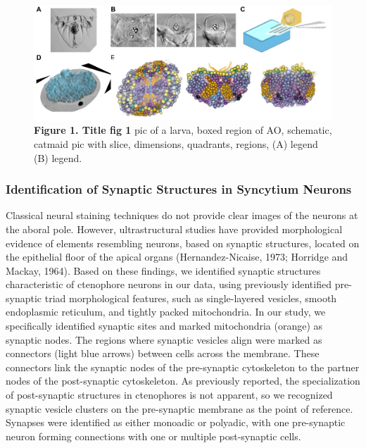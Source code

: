 \documentclass[
  11pt,
]{article}
\begin{document}
\begin{figure}[H]

{\centering \includegraphics[width=1\textwidth,height=\textheight]{figures/Figure1.png}

}

\caption{\textbf{Figure 1. Title fig 1} pic of a larva, boxed region of
AO, schematic, catmaid pic with slice, dimensions, quadrants, regions,
(A) legend (B) legend.}

\end{figure}%

\subsubsection{Identification of Synaptic Structures in Syncytium
Neurons}\label{identification-of-synaptic-structures-in-syncytium-neurons}

Classical neural staining techniques do not provide clear images of the
neurons at the aboral pole. However, ultrastructural studies have
provided morphological evidence of elements resembling neurons, based on
synaptic structures, located on the epithelial floor of the apical
organs (Hernandez-Nicaise, 1973; Horridge and Mackay, 1964). Based on
these findings, we identified synaptic structures characteristic of
ctenophore neurons in our data, using previously identified pre-synaptic
triad morphological features, such as single-layered vesicles, smooth
endoplasmic reticulum, and tightly packed mitochondria. In our study, we
specifically identified synaptic sites and marked mitochondria (orange)
as synaptic nodes. The regions where synaptic vesicles align were marked
as connectors (light blue arrows) between cells across the membrane.
These connectors link the synaptic nodes of the pre-synaptic
cytoskeleton to the partner nodes of the post-synaptic cytoskeleton. As
previously reported, the specialization of post-synaptic structures in
ctenophores is not apparent, so we recognized synaptic vesicle clusters
on the pre-synaptic membrane as the point of reference. Synapses were
identified as either monoadic or polyadic, with one pre-synaptic neuron
forming connections with one or multiple post-synaptic cells.
\end{document}
